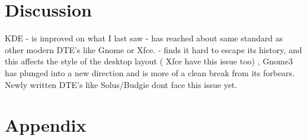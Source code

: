 \documentclass{article}  %
\begin{document}
\section{Discussion}
 
KDE   -  is improved on what I last saw
      -  has reached about same standard as other modern DTE's like Gnome or Xfce.
      -  finds it hard to escape its history, and this affects the style of the desktop layout  ( Xfce have this issue too) , Gnome3 has plunged into a new direction and is more of a clean break from its forbears.  Newly written DTE's like Solus/Budgie dont face this issue yet.


\appendix
\section{Appendix}
\end{document}
